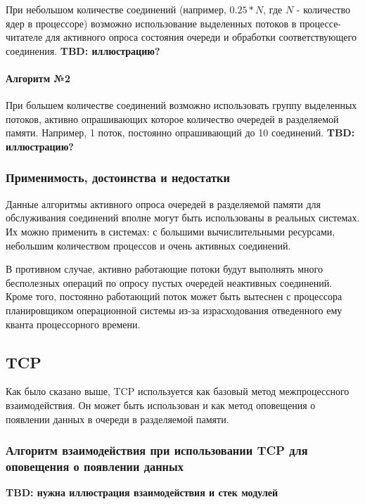 При небольшом количестве соединений (например, $0.25 * N$, где $N$ - количество ядер в процессоре) возможно использование выделенных потоков в процессе-читателе для активного опроса состояния очереди и обработки соответствующего соединения. \textbf{TBD: иллюстрацию?}

\paragraph{Алгоритм №2}

При большем количестве соединений возможно использовать группу выделенных потоков, активно опрашивающих которое количество очередей в разделяемой памяти. Например, 1 поток, постоянно опрашивающий до 10 соединений. \textbf{TBD: иллюстрацию?}

\subsubsection{Применимость, достоинства и недостатки}

Данные алгоритмы активного опроса очередей в разделяемой памяти для обслуживания соединений вполне могут быть использованы в реальных системах. Их можно применить в системах: с большими вычислительными ресурсами, небольшим количеством процессов и очень активных соединений.

В противном случае, активно работающие потоки будут выполнять много бесполезных операций по опросу пустых очередей неактивных соединений. Кроме того, постоянно работающий поток может быть вытеснен с процессора планировщиком операционной системы из-за израсходования отведенного ему кванта процессорного времени.

\subsection{TCP}\label{chapter31:SignalTCP}

Как было сказано выше, TCP используется как базовый метод межпроцессного взаимодействия. Он может быть использован и как метод оповещения о появлении данных в очереди в разделяемой памяти.

\subsubsection{Алгоритм взаимодействия при использовании TCP для оповещения о появлении данных}

\textbf{TBD: нужна иллюстрация взаимодействия и стек модулей}

